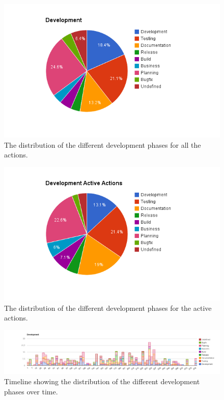 \begin{figure}[!h]
	\centering
	\includegraphics[width=\textwidth, keepaspectratio]{figures/development-p.png}
	\caption{The distribution of the different development phases for all the actions.}
	\label{figure:development-p}
\end{figure}

\begin{figure}[!h]
	\centering
	\includegraphics[width=\textwidth, keepaspectratio]{figures/development-pa.png}
	\caption{The distribution of the different development phases for the active actions.}
	\label{figure:development-pa}
\end{figure}

\begin{figure}
	\centering
	\includegraphics[width=\textwidth, keepaspectratio]{figures/development-l.png}
	\caption{Timeline showing the distribution of the different development phases over time.}
	\label{figure:development-la}
\end{figure}

